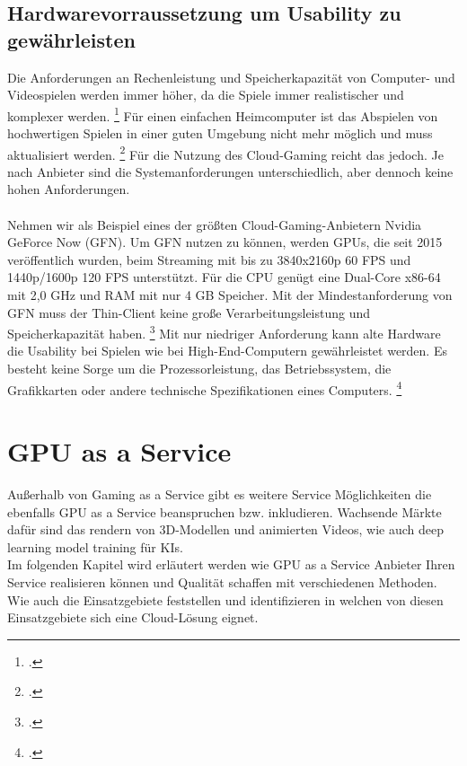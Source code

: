 \documentclass[12pt,toc=bib,toc=listof]{scrreprt}
\begin{document}
\section{Hardwarevorraussetzung um Usability zu gewährleisten}
\label{sec:Hardwarevorraussetzung um Usability zu gewährleisten}

Die Anforderungen an Rechenleistung und Speicherkapazität von Computer- und Videospielen werden immer höher, da die Spiele immer realistischer und komplexer werden. \footcite [Vgl.] [] {} Für einen einfachen Heimcomputer ist das 
Abspielen von hochwertigen Spielen in einer guten Umgebung nicht mehr möglich und muss aktualisiert werden. \footcite [Vgl.] [] {Suznjevic.2016} Für die Nutzung des Cloud-Gaming reicht das jedoch. Je nach Anbieter sind die Systemanforderungen 
unterschiedlich, aber dennoch keine hohen Anforderungen. 
\\ \\
Nehmen wir als Beispiel eines der größten Cloud-Gaming-Anbietern Nvidia GeForce Now (GFN). Um GFN nutzen zu können, werden GPUs, die seit 2015 veröffentlich wurden, beim Streaming mit 
bis zu 3840x2160p 60 FPS und 1440p/1600p 120 FPS unterstützt. Für die CPU genügt eine Dual-Core x86-64 mit 2,0 GHz und RAM mit nur 4 GB Speicher. Mit der Mindestanforderung von GFN muss der Thin-Client keine große Verarbeitungsleistung und 
Speicherkapazität haben. \footcite [Vgl.] [] {Clement.2022} 
Mit nur niedriger Anforderung kann alte Hardware die Usability bei Spielen wie bei High-End-Computern gewährleistet werden. Es besteht keine Sorge um die Prozessorleistung, das Betriebssystem, die Grafikkarten oder andere technische 
Spezifikationen eines Computers. \footcite [Vgl.] [] {Ojala.2011}

\chapter{GPU as a Service}
\label{sec:GPU as a Service}

Außerhalb von Gaming as a Service gibt es weitere Service 
Möglichkeiten die ebenfalls GPU as a Service beanspruchen bzw. inkludieren. Wachsende Märkte dafür sind
das rendern von 3D-Modellen und animierten Videos, 
wie auch deep learning model training für KIs. 
\\Im folgenden Kapitel wird erläutert werden wie GPU as a Service Anbieter Ihren Service 
realisieren können und Qualität schaffen mit verschiedenen Methoden. 
Wie auch die Einsatzgebiete feststellen und identifizieren in 
welchen von diesen Einsatzgebiete sich eine Cloud-Lösung eignet.
\end{document}
